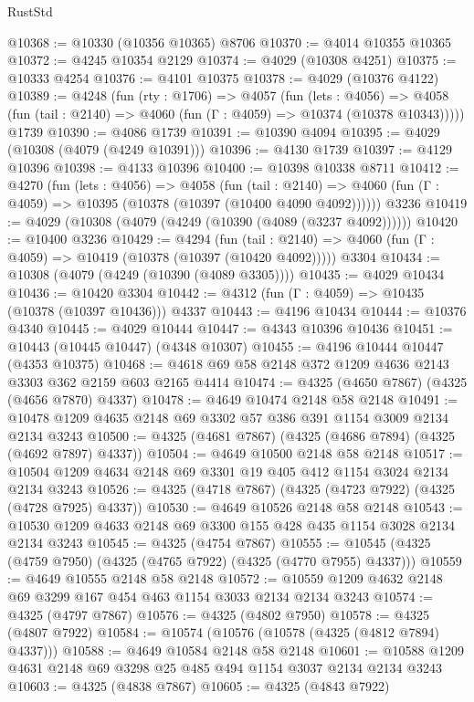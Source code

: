 \begin{lexlean}{RustStd}
\begin{coremodule}
@10368 := @10330 (@10356 @10365) @8706
@10370 := @4014 @10355 @10365
@10372 := @4245 @10354 @2129
@10374 := @4029 (@10308 @4251)
@10375 := @10333 @4254
@10376 := @4101 @10375
@10378 := @4029 (@10376 @4122)
@10389 := @4248
    (fun (rty : @1706) =>
    @4057
      (fun (lets : @4056) =>
      @4058 (fun (tail : @2140) => @4060 (fun (Γ : @4059) => @10374 (@10378 @10343)))))
    @1739
@10390 := @4086 @1739
@10391 := @10390 @4094
@10395 := @4029 (@10308 (@4079 (@4249 @10391)))
@10396 := @4130 @1739
@10397 := @4129 @10396
@10398 := @4133 @10396
@10400 := @10398 @10338 @8711
@10412 := @4270
    (fun (lets : @4056) =>
    @4058
      (fun (tail : @2140) =>
      @4060 (fun (Γ : @4059) => @10395 (@10378 (@10397 (@10400 @4090 @4092))))))
    @3236
@10419 := @4029 (@10308 (@4079 (@4249 (@10390 (@4089 (@3237 @4092))))))
@10420 := @10400 @3236
@10429 := @4294
    (fun (tail : @2140) => @4060 (fun (Γ : @4059) => @10419 (@10378 (@10397 (@10420 @4092)))))
    @3304
@10434 := @10308 (@4079 (@4249 (@10390 (@4089 @3305))))
@10435 := @4029 @10434
@10436 := @10420 @3304
@10442 := @4312 (fun (Γ : @4059) => @10435 (@10378 (@10397 @10436))) @4337
@10443 := @4196 @10434
@10444 := @10376 @4340
@10445 := @4029 @10444
@10447 := @4343 @10396 @10436
@10451 := @10443 (@10445 @10447) (@4348 @10307)
@10455 := @4196 @10444 @10447 (@4353 @10375)
@10468 := @4618 @69 @58 @2148 @372 @1209 @4636 @2143 @3303 @362 @2159 @603 @2165 @4414
@10474 := @4325 (@4650 @7867) (@4325 (@4656 @7870) @4337)
@10478 := @4649 @10474 @2148 @58 @2148
@10491 := @10478 @1209 @4635 @2148 @69 @3302 @57 @386 @391 @1154 @3009 @2134 @2134 @3243
@10500 := @4325 (@4681 @7867) (@4325 (@4686 @7894) (@4325 (@4692 @7897) @4337))
@10504 := @4649 @10500 @2148 @58 @2148
@10517 := @10504 @1209 @4634 @2148 @69 @3301 @19 @405 @412 @1154 @3024 @2134 @2134 @3243
@10526 := @4325 (@4718 @7867) (@4325 (@4723 @7922) (@4325 (@4728 @7925) @4337))
@10530 := @4649 @10526 @2148 @58 @2148
@10543 := @10530 @1209 @4633 @2148 @69 @3300 @155 @428 @435 @1154 @3028 @2134 @2134 @3243
@10545 := @4325 (@4754 @7867)
@10555 := @10545 (@4325 (@4759 @7950) (@4325 (@4765 @7922) (@4325 (@4770 @7955) @4337)))
@10559 := @4649 @10555 @2148 @58 @2148
@10572 := @10559 @1209 @4632 @2148 @69 @3299 @167 @454 @463 @1154 @3033 @2134 @2134 @3243
@10574 := @4325 (@4797 @7867)
@10576 := @4325 (@4802 @7950)
@10578 := @4325 (@4807 @7922)
@10584 := @10574 (@10576 (@10578 (@4325 (@4812 @7894) @4337)))
@10588 := @4649 @10584 @2148 @58 @2148
@10601 := @10588 @1209 @4631 @2148 @69 @3298 @25 @485 @494 @1154 @3037 @2134 @2134 @3243
@10603 := @4325 (@4838 @7867)
@10605 := @4325 (@4843 @7922)

\end{coremodule}
\end{lexlean}
